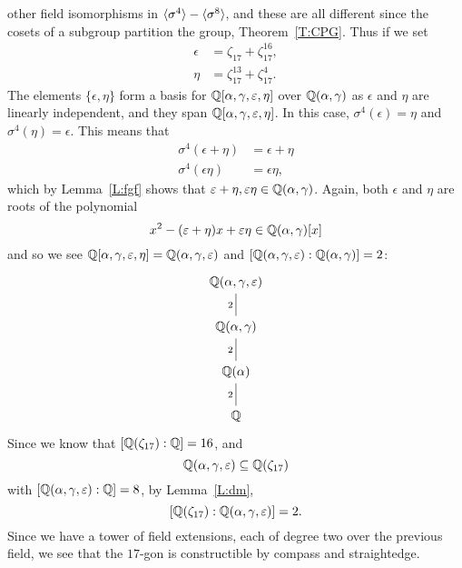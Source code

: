 \documentclass{ximera}
\begin{document}
\begin{example}
  other field isomorphisms in $\langle\sigma^4\rangle - \langle \sigma^8\rangle$, and
  these are all different since the cosets of a subgroup partition the
  group, Theorem~\ref{T:CPG}. Thus if we set
  \begin{align*}
    \epsilon &= \zeta_{17} + \zeta_{17}^{16},\\
    \eta &= \zeta_{17}^{13} + \zeta_{17}^4.
  \end{align*}
  The elements $\{\epsilon,\eta\}$ form a basis for
  $\mathbb Q[\alpha,\gamma,\varepsilon,\eta]$ over $\mathbb Q(\alpha,\gamma)$ as
  $\epsilon$ and $\eta$ are linearly independent, and they span
  $\mathbb Q[\alpha,\gamma,\varepsilon,\eta]$.  In this case,
  $\sigma^4(\epsilon) = \eta$ and $\sigma^4(\eta) = \epsilon$. This
  means that
  \begin{align*}
    \sigma^4(\epsilon+\eta) &= \epsilon + \eta\\
    \sigma^4(\epsilon\eta) &= \epsilon\eta,
  \end{align*}
  which by Lemma~\ref{L:fgf} shows that
  $\varepsilon+\eta,\varepsilon\eta\in\mathbb Q(\alpha,\gamma)$. Again, both
  $\epsilon$ and $\eta$ are roots of the polynomial
  \[
  x^2 - (\varepsilon +\eta) x + \varepsilon\eta\in\mathbb Q(\alpha,\gamma)[x]
  \]
  and so we see $\mathbb Q[\alpha,\gamma,\varepsilon,\eta]=
  \mathbb Q(\alpha,\gamma,\varepsilon)$ and
  $[\mathbb Q(\alpha,\gamma,\varepsilon):\mathbb Q(\alpha,\gamma)] = 2$:
  \[
  \begin{tikzcd}
    \Q(\alpha,\gamma,\epsilon)\\
    \Q(\alpha,\gamma)\ar[u,-,"2"]\\
    \Q(\alpha) \ar[u,-,"2"]\\
    \Q \ar[u,-,"2"]
  \end{tikzcd}
  \]
  Since we know that $[\mathbb Q(\zeta_{17}):\mathbb Q] = 16$, and
  \[
  \mathbb Q(\alpha,\gamma,\varepsilon)\subseteq \mathbb Q(\zeta_{17})
  \]
  with $[\mathbb Q(\alpha,\gamma,\varepsilon):\mathbb Q]=8$, by Lemma~\ref{L:dm},
  \[
    [\mathbb Q(\zeta_{17}):\mathbb Q(\alpha,\gamma,\varepsilon)]=2.
  \]
  Since we have a tower of field extensions, each of degree two over
  the previous field, we see that the $17$-gon is constructible by
  compass and straightedge.
\end{example}
\end{document}
